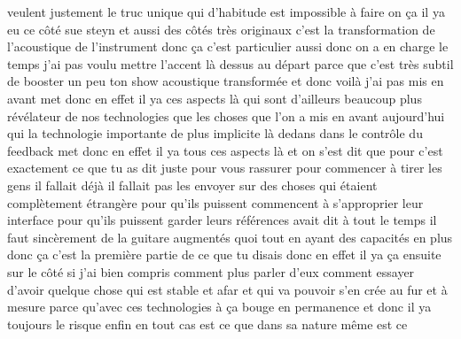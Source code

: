  veulent justement le truc unique qui d'habitude est impossible à faire on ça il ya eu ce côté sue steyn et aussi des côtés très originaux c'est la transformation de l'acoustique de l'instrument donc ça c'est particulier aussi donc on a en charge le temps j'ai pas voulu mettre l'accent là dessus au départ parce que c'est très subtil de booster un peu ton show acoustique transformée et donc voilà j'ai pas mis en avant met donc en effet il ya ces aspects là qui sont d'ailleurs beaucoup plus révélateur de nos technologies que les choses que l'on a mis en avant aujourd'hui qui la technologie importante de plus implicite là dedans dans le contrôle du feedback met donc en effet il ya tous ces aspects là et on s'est dit que pour c'est exactement ce que tu as dit juste pour vous rassurer pour commencer à tirer les gens il fallait déjà il fallait pas les envoyer sur des choses qui étaient complètement étrangère pour qu'ils puissent commencent à s'approprier leur interface pour qu'ils puissent garder leurs références avait dit à tout le temps il faut sincèrement de la guitare augmentés quoi tout en ayant des capacités en plus donc ça c'est la première partie de ce que tu disais donc en effet il ya ça ensuite sur le côté si j'ai bien compris comment plus parler d'eux comment essayer d'avoir quelque chose qui est stable et afar et qui va pouvoir s'en crée au fur et à mesure parce qu'avec ces technologies à ça bouge en permanence et donc il ya toujours le risque enfin en tout cas est ce que dans sa nature même est ce 
